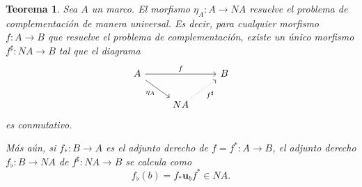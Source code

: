 \documentclass[12pt,letterpaper,titlepage]{article}
\newtheorem{thm}{Teorema}
\theoremstyle{definition}
\newcommand\unuc[1]{\mathbf u_{#1}}
\newcommand\<{\langle}
\renewcommand\>{\rangle}
\begin{document}
\begin{thm}
  Sea $A$ un marco.
  El morfismo $\eta_A:A\to NA$ resuelve el problema de
  complementación de manera universal.
  Es decir, para cualquier morfismo $f:A\to B$ que resuelve el
  problema de complementación, existe un único morfismo
  $f^\sharp:NA\to B$ tal que el diagrama
  \[
    \begin{tikzcd}
      A \ar[dr,"\eta_A"'] \ar[rr,"f"] && B \\
      & NA \ar[ur,"f^\sharp"',dotted]
    \end{tikzcd}
  \]
  es conmutativo.

  Más aún, si $f_*:B\to A$ es el adjunto derecho de $f=f^*:A\to
  B$, el adjunto derecho $f_\flat:B\to NA$ de $f^\sharp:NA\to B$
  se calcula como
  \[
    f_\flat(b) = f_*\unuc b f^* \in NA
  .\]
\end{thm}
\end{document}
